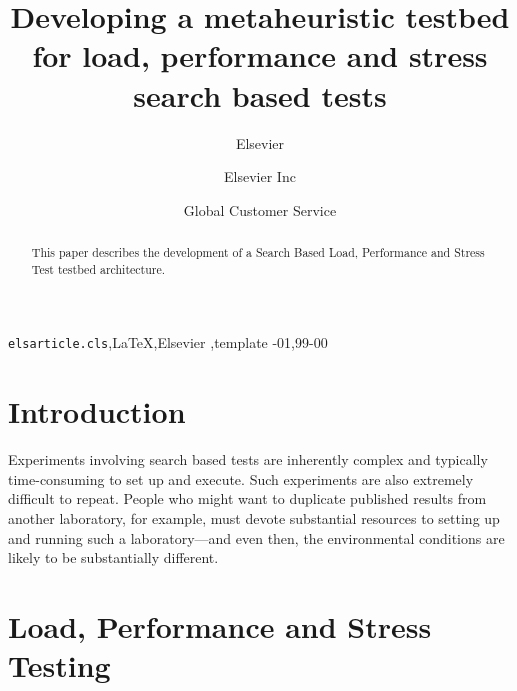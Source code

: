 \documentclass[review]{elsarticle}
\begin{document}
\begin{frontmatter}

\title{Developing a metaheuristic testbed for load, performance and stress search based tests}

\author{Elsevier}
\address{Radarweg 29, Amsterdam}

\author[mymainaddress,mysecondaryaddress]{Elsevier Inc}

\author[mysecondaryaddress]{Global Customer Service}

\address[mymainaddress]{1600 John F Kennedy Boulevard, Philadelphia}
\address[mysecondaryaddress]{360 Park Avenue South, New York}

\begin{abstract}
This paper describes the development of a Search Based Load, Performance and Stress Test testbed architecture.
\end{abstract}

\begin{keyword}
\texttt{elsarticle.cls}\sep \LaTeX\sep Elsevier \sep template
-01\sep  99-00
\end{keyword}

\end{frontmatter}

\linenumbers

\section{Introduction}

Experiments involving search based tests are inherently complex and typically time-consuming to set up and
execute. Such experiments are also extremely difficult to
repeat. People who might want to duplicate published results
from another laboratory, for example, must devote substantial resources to setting up and running such a laboratory—and even then, the environmental conditions are likely to be substantially different. 



\section{Load, Performance and Stress Testing}
\end{document}
